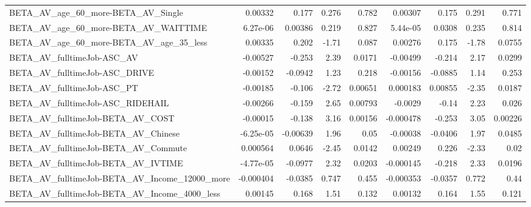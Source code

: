 \begin{tabular}{lrrrrrrrr}
BETA\_AV\_age\_60\_more-BETA\_AV\_Single                 &     0.00332 &        0.177 &    0.276 &    0.782 &    0.00307 &       0.175 &        0.291 &         0.771 \\
BETA\_AV\_age\_60\_more-BETA\_AV\_WAITTIME               &    6.27e-06 &      0.00386 &    0.219 &    0.827 &   5.44e-05 &      0.0308 &        0.235 &         0.814 \\
BETA\_AV\_age\_60\_more-BETA\_AV\_age\_35\_less            &     0.00335 &        0.202 &    -1.71 &    0.087 &    0.00276 &       0.175 &        -1.78 &        0.0755 \\
BETA\_AV\_fulltimeJob-ASC\_AV                         &    -0.00527 &       -0.253 &     2.39 &   0.0171 &   -0.00499 &      -0.214 &         2.17 &        0.0299 \\
BETA\_AV\_fulltimeJob-ASC\_DRIVE                      &    -0.00152 &      -0.0942 &     1.23 &    0.218 &   -0.00156 &     -0.0885 &         1.14 &         0.253 \\
BETA\_AV\_fulltimeJob-ASC\_PT                         &    -0.00185 &       -0.106 &    -2.72 &  0.00651 &   0.000183 &     0.00855 &        -2.35 &        0.0187 \\
BETA\_AV\_fulltimeJob-ASC\_RIDEHAIL                   &    -0.00266 &       -0.159 &     2.65 &  0.00793 &    -0.0029 &       -0.14 &         2.23 &         0.026 \\
BETA\_AV\_fulltimeJob-BETA\_AV\_COST                   &    -0.00015 &       -0.138 &     3.16 &  0.00156 &  -0.000478 &      -0.253 &         3.05 &       0.00226 \\
BETA\_AV\_fulltimeJob-BETA\_AV\_Chinese                &   -6.25e-05 &     -0.00639 &     1.96 &     0.05 &   -0.00038 &     -0.0406 &         1.97 &        0.0485 \\
BETA\_AV\_fulltimeJob-BETA\_AV\_Commute                &    0.000564 &       0.0646 &    -2.45 &   0.0142 &    0.00249 &       0.226 &        -2.33 &          0.02 \\
BETA\_AV\_fulltimeJob-BETA\_AV\_IVTIME                 &   -4.77e-05 &      -0.0977 &     2.32 &   0.0203 &  -0.000145 &      -0.218 &         2.33 &        0.0196 \\
BETA\_AV\_fulltimeJob-BETA\_AV\_Income\_12000\_more      &   -0.000404 &      -0.0385 &    0.747 &    0.455 &  -0.000353 &     -0.0357 &        0.772 &          0.44 \\
BETA\_AV\_fulltimeJob-BETA\_AV\_Income\_4000\_less       &     0.00145 &        0.168 &     1.51 &    0.132 &    0.00132 &       0.164 &         1.55 &         0.121 \\

\end{tabular}
